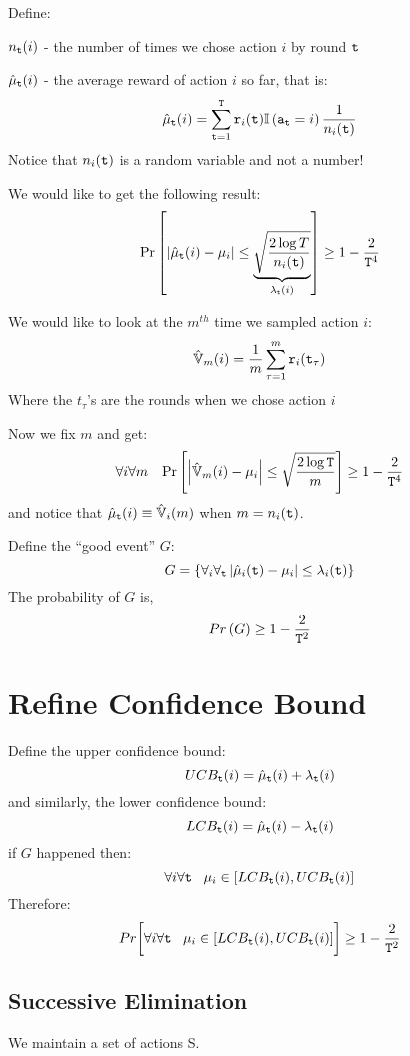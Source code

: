 Define:

$n_{{\tt t}}(i)$ - the number of times we chose action $i$ by round ${\tt t}$

$\hat{\mu}_{{\tt t}}(i)$ - the average reward of action $i$ so far, that
is:
\[
\hat{\mu}_{{\tt t}}(i)={\displaystyle
\sum_{{\tt t}=1}^{{\tt T}}{\tt r}_{i}({\tt t})}\mathbb{I}\left({\tt a}_{{\tt t}}=i\right)\frac{1}{n_{i}({\tt t})}
\]
Notice that $n_{i}({\tt t})$ is a random variable and not a number!

We would like to get the following result:
\[
\Pr\left[\left|\hat{\mu}_{{\tt t}}(i)-\mu_{i}\right|\le\underbrace{\sqrt{\frac{2\log
T}{n_{i}({\tt t})}}}_{\lambda_{{\tt t}}(i)}\right]\ge1-\frac{2}{{\tt T}^{4}}
\]

We would like to look at the $m^{th}$ time we sampled action $i$:
\[
\hat{\mathbb{V}}_{m}(i)=\frac{1}{m} \sum_{\tau=1}^{m}{\tt r}_{i}({\tt t}_{\tau})
\]
Where the $t_{\tau}$'s are the rounds when we chose action $i$

Now we fix $m$ and get:
\[
\forall{i}\forall{m}\;\;\;
\Pr\left[\left|\hat{\mathbb{V}}_{m}(i)-\mu_{i}\right|\le\sqrt{\frac{2\log
{\tt T}}{m}}\right]\ge1-\frac{2}{{\tt T}^{4}}
\]
and notice that $\hat{\mu}_{{\tt t}}(i)\equiv\hat{\mathbb{V}}_{i}(m)$ when
$m=n_{i}({\tt t})$.

Define the ``good event'' $G$:
\[
G=\left\{ \forall_{i}\forall_{{\tt t}}\left|\hat{\mu}_{i}({\tt t})-\mu_{i}\right|\le\lambda_{i}({\tt t})\right\}
\]
The probability of $G$ is,
\[
Pr\left(G\right)\ge1-\frac{2}{{\tt T}^{2}}
\]

\section{Refine Confidence Bound}

Define the upper confidence bound:
\[
UCB_{{\tt t}}(i)=\hat{\mu}_{{\tt t}}(i)+\lambda_{{\tt t}}(i)
\]
and similarly, the lower confidence bound:
\[
LCB_{{\tt t}}(i)=\hat{\mu}_{{\tt t}}(i)-\lambda_{{\tt t}}(i)
\]
if $G$ happened then:
\[
\forall{i}\forall{{\tt t}}\;\;\;\mu_{i}\in\left[LCB_{{\tt t}}(i),UCB_{{\tt t}}(i)\right]
\]
Therefore:
\[
Pr\biggl[\forall{i}\forall{{\tt t}}\;\;\;
\mu_{i}\in\left[LCB_{{\tt t}}(i),UCB_{{\tt t}}(i)\right]\biggr]\ge1-\frac{2}{{\tt T}^{2}}
\]

\subsection{Successive Elimination}

We maintain a set of actions S.


